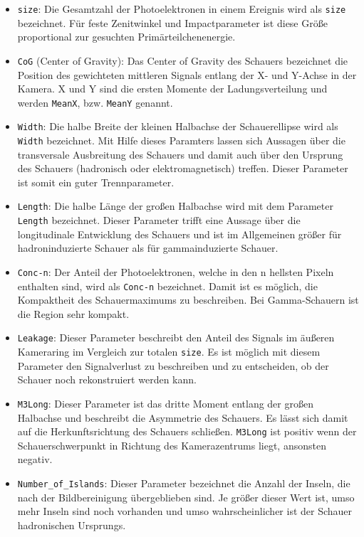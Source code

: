 \begin{itemize}
 \item \texttt{size}: Die Gesamtzahl der Photoelektronen in einem Ereignis wird als \texttt{size} bezeichnet. Für feste Zenitwinkel und Impactparameter ist diese Größe proportional zur gesuchten Primärteilchenenergie.
 \item \texttt{CoG} (Center of Gravity): Das Center of Gravity des Schauers bezeichnet die Position des gewichteten mittleren Signals entlang der X- und Y-Achse in der Kamera. 
 X und Y sind die ersten Momente der Ladungsverteilung und werden \texttt{MeanX}, bzw. \texttt{MeanY} genannt.
 \item \texttt{Width}: Die halbe Breite der kleinen Halbachse der Schauerellipse wird als \texttt{Width} bezeichnet. 
 Mit Hilfe dieses Paramters lassen sich Aussagen über die transversale Ausbreitung des Schauers und damit auch über den Ursprung des Schauers (hadronisch oder elektromagnetisch) treffen. 
 Dieser Parameter ist somit ein guter Trennparameter.
 \item \texttt{Length}: Die halbe Länge der großen Halbachse wird mit dem Parameter \texttt{Length} bezeichnet.
 Dieser Parameter trifft eine Aussage über die longitudinale Entwicklung des Schauers und ist im Allgemeinen größer für hadroninduzierte Schauer als für gammainduzierte Schauer.
 \item \texttt{Conc-n}: Der Anteil der Photoelektronen, welche in den n hellsten Pixeln enthalten sind, wird als \texttt{Conc-n} bezeichnet.
 Damit ist es möglich, die Kompaktheit des Schauermaximums zu beschreiben. 
 Bei Gamma-Schauern ist die Region sehr kompakt.
 \item \texttt{Leakage}: Dieser Parameter beschreibt den Anteil des Signals im äußeren Kameraring im Vergleich zur totalen \texttt{size}.
 Es ist möglich mit diesem Parameter den Signalverlust zu beschreiben und zu entscheiden, ob der Schauer noch rekonstruiert werden kann.
 \item \texttt{M3Long}: Dieser Parameter ist das dritte Moment entlang der großen Halbachse und beschreibt die Asymmetrie des Schauers.
 Es lässt sich damit auf die Herkunftsrichtung des Schauers schließen. 
 \texttt{M3Long} ist positiv wenn der Schauerschwerpunkt in Richtung des Kamerazentrums liegt, ansonsten negativ.
 \item \texttt{Number\_of\_Islands}: Dieser Parameter bezeichnet die Anzahl der Inseln, die nach der Bildbereinigung übergeblieben sind. 
 Je größer dieser Wert ist, umso mehr Inseln sind noch vorhanden und umso wahrscheinlicher ist der Schauer hadronischen Ursprungs.
\end{itemize}

